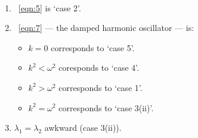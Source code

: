 \documentclass[12pt]{report}
\theoremstyle{definition}
\begin{document}
\begin{ex}
    \,

    \begin{enumerate}[label = (\roman*)]
        \item~\eqref{eqn:5} is `case 2'.

        \item~\eqref{eqn:7} --- the damped harmonic oscillator --- is:
            \begin{itemize}
                    \item $k=0$ corresponds to `case 5'.
                    \item $k^{2} < \omega^{2}$ coresponds to `case 4'.
                    \item $k^{2} > \omega^{2}$ corresponds to `case 1'.
                    \item $k^{2} = \omega^{2}$ corresponds to `case 3(ii)'.
            \end{itemize}
            
        \item $\lambda_1 = \lambda_2$ awkward (case 3(ii)).


\end{enumerate}
\end{ex}
\end{document}
